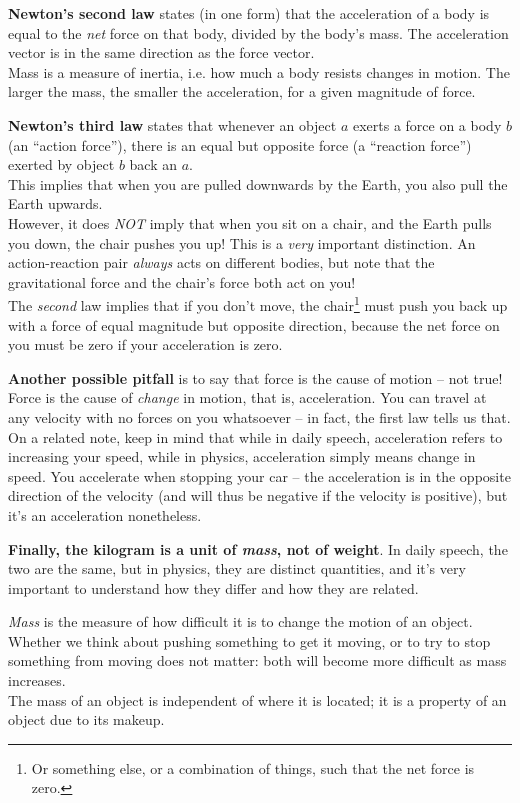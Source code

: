 \documentclass[8.01x]{subfiles}
\begin{document}
\textbf{Newton's second law} states (in one form) that the acceleration of a body is equal to the \emph{net} force on that body, divided by the body's mass. The acceleration vector is in the same direction as the force vector.\\
Mass is a measure of inertia, i.e. how much a body resists changes in motion. The larger the mass, the smaller the acceleration, for a given magnitude of force.

\textbf{Newton's third law} states that whenever an object $a$ exerts a force on a body $b$ (an ``action force''), there is an equal but opposite force (a ``reaction force'') exerted by object $b$ back an $a$.\\
This implies that when you are pulled downwards by the Earth, you also pull the Earth upwards.\\
However, it does \emph{NOT} imply that when you sit on a chair, and the Earth pulls you down, the chair pushes you up! This is a \emph{very} important distinction. An action-reaction pair \emph{always} acts on different bodies, but note that the gravitational force and the chair's force both act on you!\\
The \emph{second} law implies that if you don't move, the chair\footnote{Or something else, or a combination of things, such that the net force is zero.} must push you back up with a force of equal magnitude but opposite direction, because the net force on you must be zero if your acceleration is zero.

\textbf{Another possible pitfall} is to say that force is the cause of motion -- not true! Force is the cause of \emph{change} in motion, that is, acceleration. You can travel at any velocity with no forces on you whatsoever -- in fact, the first law tells us that.\\
On a related note, keep in mind that while in daily speech, acceleration refers to increasing your speed, while in physics, acceleration simply means change in speed. You accelerate when stopping your car -- the acceleration is in the opposite direction of the velocity (and will thus be negative if the velocity is positive), but it's an acceleration nonetheless.

\textbf{Finally, the kilogram is a unit of \emph{mass}, not of weight}. In daily speech, the two are the same, but in physics, they are distinct quantities, and it's very important to understand how they differ and how they are related.

\emph{Mass} is the measure of how difficult it is to change the motion of an object. Whether we think about pushing something to get it moving, or to try to stop something from moving does not matter: both will become more difficult as mass increases.\\
The mass of an object is independent of where it is located; it is a property of an object due to its makeup.
\end{document}
